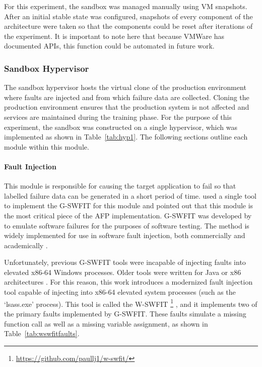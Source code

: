 For this experiment, the sandbox was managed manually using \ac{VM} snapshots.
After an initial stable state was configured, snapshots of every component of
the architecture were taken so that the components could be reset after
iterations of the experiment.  It is important to note here that because VMWare
has documented \ac{API}s, this function could be automated in future work.

\subsubsection{Sandbox Hypervisor} \label{sec:sandbox}
The sandbox hypervisor hosts the virtual clone of the production environment
where faults are injected and from which failure data are collected.  Cloning
the production environment ensures that the production system is not affected
and services are maintained during the training phase.  For the purpose of this
experiment, the sandbox was constructed on a single hypervisor, which was
implemented as shown in Table~\ref{tab:hyp1}.  The following sections outline
each module within this module.

\paragraph{Fault Injection} \label{sec:faultInjectionTool} 
This module is responsible for causing the target application to fail so that
labelled failure data can be generated in a short period of time.
\citet{irrera2015} used a single tool to implement the \ac{G-SWFIT} for this
module and pointed out that this module is the most critical piece of the
\ac{AFP} implementation.  \ac{G-SWFIT} was developed by \citet{gswfit} to
emulate software failures for the purposes of software testing.  The method is
widely implemented for use in software fault injection, both commercially and
academically \citep{cotroneo2012,irrera2014,natella2010,umadevi2015}. 

Unfortunately, previous \ac{G-SWFIT} tools were incapable of injecting faults
into elevated x86-64 Windows processes.  Older tools were written for Java or
x86 architectures \citep{gswfit,martins2002jaca,natella2010,sanches2011jswfit}.
For this reason, this work introduces a modernized fault injection tool capable
of injecting into x86-64 elevated system processes (such as the `lsass.exe'
process).  This tool is called the
\ac{W-SWFIT} \footnote{\url{https://github.com/paullj1/w-swfit/}}
, and it implements two of the primary faults implemented by \ac{G-SWFIT}.
These faults simulate a missing function call as well as a missing variable
assignment, as shown in Table~\ref{tab:wswfitfaults}.

